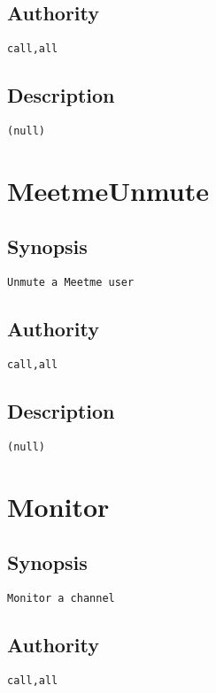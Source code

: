 \subsection{Authority}
\begin{verbatim}
call,all
\end{verbatim}
\subsection{Description}
\begin{verbatim}
(null)
\end{verbatim}


\section{MeetmeUnmute}
\subsection{Synopsis}
\begin{verbatim}
Unmute a Meetme user
\end{verbatim}
\subsection{Authority}
\begin{verbatim}
call,all
\end{verbatim}
\subsection{Description}
\begin{verbatim}
(null)
\end{verbatim}


\section{Monitor}
\subsection{Synopsis}
\begin{verbatim}
Monitor a channel
\end{verbatim}
\subsection{Authority}
\begin{verbatim}
call,all
\end{verbatim}
